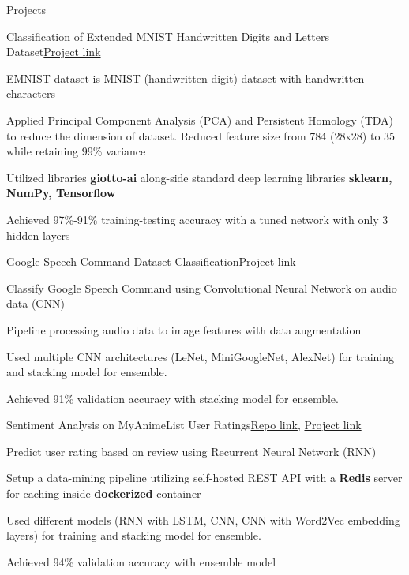 \begin{rSection}{Projects}
    \begin{rSubsection}{Classification of Extended MNIST Handwritten Digits and Letters Dataset}{}{\href{https://colab.research.google.com/drive/18z161k3diYO6sNVBfiKH8uGqbrekxMPN?usp=sharing}{Project link}}{}
        \item EMNIST dataset is MNIST (handwritten digit) dataset with handwritten characters
        \item Applied Principal Component Analysis (PCA) and Persistent Homology (TDA) to reduce the dimension of dataset. Reduced feature size from 784 (28x28) to 35 while retaining 99\% variance
        \item Utilized libraries \textbf{giotto-ai} along-side standard deep learning libraries \textbf{sklearn, NumPy, Tensorflow}
        \item Achieved 97\%-91\% training-testing accuracy with a tuned network with only 3 hidden layers
    \end{rSubsection}

    \begin{rSubsection}{Google Speech Command Dataset Classification}{}{\href{https://colab.research.google.com/drive/1KCJjwgW6VDlANLmXYTotatk2xux3nw0N?usp=sharing}{Project link}}{}
        \item Classify Google Speech Command using Convolutional Neural Network on audio data (CNN)
        \item Pipeline processing audio data to image features with data augmentation
        \item Used multiple CNN architectures (LeNet, MiniGoogleNet, AlexNet) for training and stacking model for ensemble.
        \item Achieved 91\% validation accuracy with stacking model for ensemble.
    \end{rSubsection}

    \begin{rSubsection}{Sentiment Analysis on MyAnimeList User Ratings}{}{\href{https://github.com/n0k0m3/rnn-mal-sentiment}{Repo link}, \href{https://colab.research.google.com/github/n0k0m3/rnn-mal-sentiment/blob/main/main.ipynb}{Project link}}{}
        \item Predict user rating based on review using Recurrent Neural Network (RNN)
        \item Setup a data-mining pipeline utilizing self-hosted REST API with a \textbf{Redis} server for caching inside \textbf{dockerized} container
        \item Used different models (RNN with LSTM, CNN, CNN with Word2Vec embedding layers) for training and stacking model for ensemble.
        \item Achieved 94\% validation accuracy with ensemble model
    \end{rSubsection}


\end{rSection}
